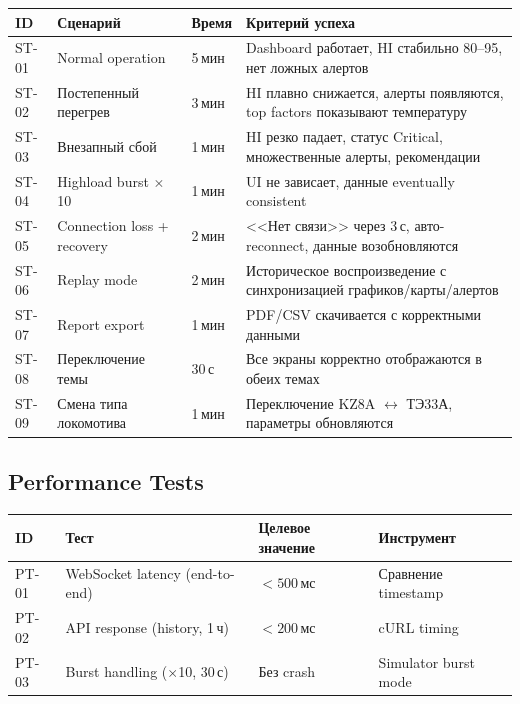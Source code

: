 \documentclass[12pt,a4paper]{article}
\begin{document}
\begin{longtable}{l L{3.5cm} C{1.5cm} L{5.5cm}}
\toprule
\textbf{ID} & \textbf{Сценарий} & \textbf{Время} & \textbf{Критерий успеха} \\
\midrule
\endhead
ST-01 & Normal operation & 5\,мин & Dashboard работает, HI стабильно 80--95, нет ложных алертов \\
ST-02 & Постепенный перегрев & 3\,мин & HI плавно снижается, алерты появляются, top factors показывают температуру \\
ST-03 & Внезапный сбой & 1\,мин & HI резко падает, статус Critical, множественные алерты, рекомендации \\
ST-04 & Highload burst $\times$10 & 1\,мин & UI не зависает, данные eventually consistent \\
ST-05 & Connection loss + recovery & 2\,мин & <<Нет связи>> через 3\,с, авто-reconnect, данные возобновляются \\
ST-06 & Replay mode & 2\,мин & Историческое воспроизведение с синхронизацией графиков/карты/алертов \\
ST-07 & Report export & 1\,мин & PDF/CSV скачивается с корректными данными \\
ST-08 & Переключение темы & 30\,с & Все экраны корректно отображаются в обеих темах \\
ST-09 & Смена типа локомотива & 1\,мин & Переключение KZ8A $\leftrightarrow$ ТЭ33А, параметры обновляются \\
\bottomrule
\end{longtable}

\subsection{Performance Tests}

\begin{tabularx}{\textwidth}{l L{5cm} l l}
\toprule
\textbf{ID} & \textbf{Тест} & \textbf{Целевое значение} & \textbf{Инструмент} \\
\midrule
PT-01 & WebSocket latency (end-to-end) & $< 500$\,мс & Сравнение timestamp \\
PT-02 & API response (history, 1\,ч) & $< 200$\,мс & cURL timing \\
PT-03 & Burst handling ($\times$10, 30\,с) & Без crash & Simulator burst mode \\
\bottomrule
\end{tabularx}


\end{document}
